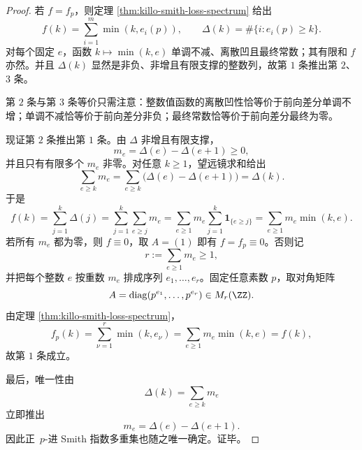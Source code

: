 \begin{proof}
若 \(f=f_p\)，则定理 \ref{thm:killo-smith-loss-spectrum} 给出
\[
f(k)=\sum_{i=1}^{m}\min(k,e_i(p)),
\qquad
\Delta(k)=\#\{i:e_i(p)\ge k\}.
\]
对每个固定 \(e\)，函数 \(k\mapsto \min(k,e)\) 单调不减、离散凹且最终常数；其有限和 \(f\) 亦然。并且 \(\Delta(k)\) 显然是非负、非增且有限支撑的整数列，故第 \(1\) 条推出第 \(2\)、\(3\) 条。

第 \(2\) 条与第 \(3\) 条等价只需注意：整数值函数的离散凹性恰等价于前向差分单调不增；单调不减恰等价于前向差分非负；最终常数恰等价于前向差分最终为零。

现证第 \(2\) 条推出第 \(1\) 条。由 \(\Delta\) 非增且有限支撑，
\[
m_e=\Delta(e)-\Delta(e+1)\ge 0,
\]
并且只有有限多个 \(m_e\) 非零。对任意 \(k\ge 1\)，望远镜求和给出
\[
\sum_{e\ge k}m_e
=
\sum_{e\ge k}\bigl(\Delta(e)-\Delta(e+1)\bigr)
=
\Delta(k).
\]
于是
\[
f(k)
=
\sum_{j=1}^{k}\Delta(j)
=
\sum_{j=1}^{k}\sum_{e\ge j}m_e
=
\sum_{e\ge 1}m_e\sum_{j=1}^{k}\mathbf 1_{\{e\ge j\}}
=
\sum_{e\ge 1}m_e\min(k,e).
\]
若所有 \(m_e\) 都为零，则 \(f\equiv 0\)，取 \(A=(1)\) 即有 \(f=f_p\equiv 0\)。否则记
\[
r:=\sum_{e\ge 1}m_e\ge 1,
\]
并把每个整数 \(e\) 按重数 \(m_e\) 排成序列 \(e_1,\dots,e_r\)。固定任意素数 \(p\)，取对角矩阵
\[
A=\operatorname{diag}(p^{e_1},\dots,p^{e_r})\in M_r(\ZZ).
\]
由定理 \ref{thm:killo-smith-loss-spectrum}，
\[
f_p(k)=\sum_{\nu=1}^{r}\min(k,e_\nu)=\sum_{e\ge 1}m_e\min(k,e)=f(k),
\]
故第 \(1\) 条成立。

最后，唯一性由
\[
\Delta(k)=\sum_{e\ge k}m_e
\]
立即推出
\[
m_e=\Delta(e)-\Delta(e+1).
\]
因此正 \(\,p\)-进 Smith 指数多重集也随之唯一确定。证毕。
\end{proof}

